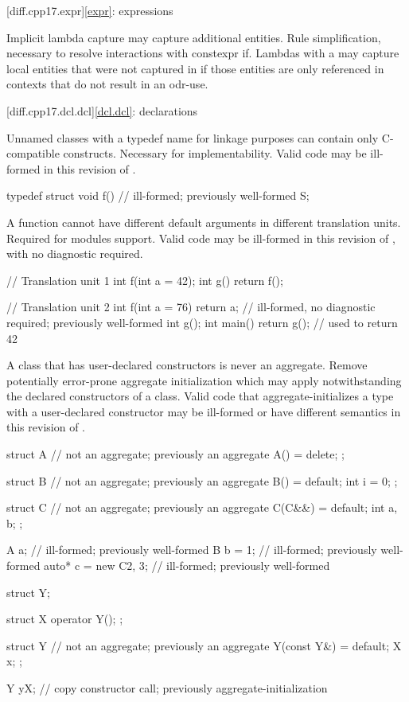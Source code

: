 [diff.cpp17.expr]{\ref{expr}: expressions}

\change
Implicit lambda capture may capture additional entities.
\rationale
Rule simplification, necessary to resolve interactions with constexpr if.
\effect
Lambdas with a 
may capture local entities
that were not captured in \CppXVII{}
if those entities are only referenced in contexts
that do not result in an odr-use.

[diff.cpp17.dcl.dcl]{\ref{dcl.dcl}: declarations}

\change
Unnamed classes with a typedef name for linkage purposes
can contain only C-compatible constructs.
\rationale
Necessary for implementability.
\effect
Valid \CppXVII{} code may be ill-formed in this revision of \Cpp{}.
\begin{codeblock}
typedef struct {
  void f() {}           // ill-formed; previously well-formed
} S;
\end{codeblock}

\change
A function cannot have different default arguments
in different translation units.
\rationale
Required for modules support.
\effect
Valid \CppXVII{} code may be ill-formed in this revision of \Cpp{},
with no diagnostic required.
\begin{codeblock}
// Translation unit 1
int f(int a = 42);
int g() { return f(); }

// Translation unit 2
int f(int a = 76) { return a; }         // ill-formed, no diagnostic required; previously well-formed
int g();
int main() { return g(); }              // used to return 42
\end{codeblock}

\change
A class that has user-declared constructors is never an aggregate.
\rationale
Remove potentially error-prone aggregate initialization
which may apply notwithstanding the declared constructors of a class.
\effect
Valid \CppXVII{} code that aggregate-initializes
a type with a user-declared constructor
may be ill-formed or have different semantics
in this revision of \Cpp{}.
\begin{codeblock}
struct A {              // not an aggregate; previously an aggregate
  A() = delete;
};

struct B {              // not an aggregate; previously an aggregate
  B() = default;
  int i = 0;
};

struct C {              // not an aggregate; previously an aggregate
  C(C&&) = default;
  int a, b;
};

A a{};                  // ill-formed; previously well-formed
B b = {1};              // ill-formed; previously well-formed
auto* c = new C{2, 3};  // ill-formed; previously well-formed

struct Y;

struct X {
  operator Y();
};

struct Y {              // not an aggregate; previously an aggregate
  Y(const Y&) = default;
  X x;
};

Y y{X{}};               // copy constructor call; previously aggregate-initialization
\end{codeblock}

